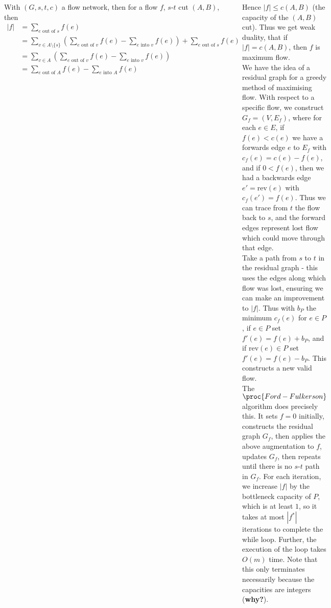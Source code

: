 \documentclass{tikzposter} %
\begin{document}
\begin{columns}
{  With $(G, s, t, c)$ a flow network, then for a flow $f$, $s$-$t$ cut $(A, B)$, then
  \begin{align*}
    |f| &= \sum_{\text{$e$ out of $s$}} f(e) \\
        &= \sum_{v \in A \setminus \{s\}} \left(\sum_{\text{$e$ out of $v$}} f(e) - \sum_{\text{$e$ into $v$}} f(e)\right) + \sum_{\text{$e$ out of $s$}} f(e) \\
        &= \sum_{v \in A} \left(\sum_{\text{$e$ out of $v$}} f(e) - \sum_{\text{$e$ into $v$}} f(e)\right) \\
        &= \sum_{\text{$e$ out of $A$}} f(e) - \sum_{\text{$e$ into $A$}} f(e) \\
  \end{align*}

  Hence $|f| \le c(A,B)$ (the capacity of the $(A,B)$ cut). Thus we get weak duality, that if $|f| = c(A,B)$, then $f$ is maximum flow. \\

  We have the idea of a residual graph for a greedy method of maximising flow. With respect to a specific flow, we construct $G_{f} = (V, E_{f})$, where for each $e \in E$, if $f(e) < c(e)$ we have a forwards edge $e$ to $E_{f}$ with $c_{f}(e) = c(e) - f(e)$, and if $0 < f(e)$, then we had a backwards edge $e' = \mathrm{rev}(e)$ with $c_{f}(e') = f(e)$. Thus we can trace from $t$ the flow back to $s$, and the forward edges represent lost flow which could move through that edge. \\

  Take a path from $s$ to $t$ in the residual graph - this uses the edges along which flow was lost, ensuring we can make an improvement to $|f|$. Thus with $b_{P}$ the minimum $c_{f}(e)$ for $e \in P$, if $e \in P$ set $f'(e) = f(e) + b_{P}$, and if $\mathrm{rev}(e) \in P$ set $f'(e) = f(e) - b_{P}$. This constructs a new valid flow. \\

  The $\proc{Ford-Fulkerson}$ algorithm does precisely this. It sets $f = 0$ initially, constructs the residual graph $G_{f}$, then applies the above augmentation to $f$, updates $G_{f}$, then repeats until there is no $s$-$t$ path in $G_{f}$. For each iteration, we increase $|f|$ by the bottleneck capacity of $P$, which is at least $1$, so it takes at most $|f^{*}|$ iterations to complete the while loop. Further, the execution of the loop takes $O(m)$ time. Note that this only terminates necessarily because the capacities are integers (\textbf{why?}).  \\

}
\end{columns}
\end{document}
